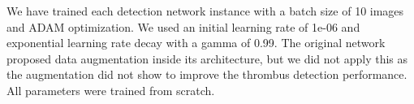 \documentclass[preprint,authoryear,12pt]{elsarticle}
\begin{document}




We have trained each detection network instance with a batch size of 10 images and ADAM optimization. We used an initial learning rate of 1e-06 and exponential learning rate decay with a gamma of 0.99. The original network proposed data augmentation inside its architecture, but we did not apply this as the augmentation did not show to improve the thrombus detection performance. All parameters were trained from scratch.

\end{document}
